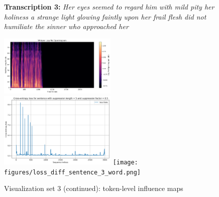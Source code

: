 \documentclass[../report.tex]{subfiles}
\begin{document}
    \begin{figure}[p]
        \centering
        \begin{minipage}{0.95\textwidth}
        \raggedright
        \textbf{Transcription 3:} \textit{Her eyes seemed to regard him with mild pity her holiness a strange light glowing faintly upon her frail flesh did not humiliate the sinner who approached her}
        \end{minipage}
        
        \includegraphics[width=0.5\textwidth]{figures/mel3.png}
        \includegraphics[width=0.5\textwidth]{figures/loss_diff_sentence_3_sentence.png}
        \texttt{[image: figures/loss\_diff\_sentence\_3\_word.png]}
        \caption{Visualization set 3 (continued): token-level influence maps}
        \label{fig:viz_set3}
    \end{figure}
\end{document}
